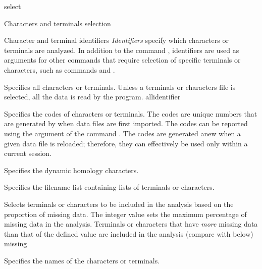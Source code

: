 \begin{command}{select}{}
\begin{arguments}
\begin{argumentgroup}{Characters and terminals selection}
	\end{argumentgroup}
		
        \begin{argumentgroup}{Character and terminal identifiers}\label{identifiers}
        {\emph{Identifiers} specify which characters or terminals are analyzed.
        In addition to the command , identifiers are used as
        arguments for other commands that require selection of specific terminals or
        characters, such as commands  and
        .}

                {Specifies all characters or terminals.  Unless a terminals or characters file
                is selected, all the data is read by the program.}
                {allidentifier}

                {Specifies the codes of characters or terminals. The codes are unique
                numbers that are generated by \poy when data files are first imported.
                The codes can be reported using the argument 
                of the command . The codes are generated anew
                when a given data file is reloaded; therefore, they can effectively be used
                only within a current \poy session.}
                {}

                {Specifies the dynamic homology characters.}
                {}

                {Specifies the filename list containing lists of terminals or
                characters.}
                {}

                {Selects terminals or characters to be included in the analysis
                based on the proportion of missing data. The
                integer value sets the maximum percentage of missing
                data in the analysis. Terminals or characters that have \emph{more} missing data
                than that of the defined value are included in the analysis (compare with  below)}
                {missing}
                
                {Specifies the names of the characters or terminals.}
                {}


\end{argumentgroup}
\end{arguments}
\end{command}
